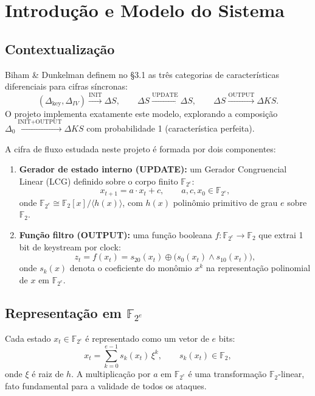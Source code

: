 \documentclass[12pt,a4paper]{article}
\theoremstyle{definition}
\theoremstyle{remark}
\newcommand{\GF}[1]{\mathbb{F}_{2^{#1}}}
\newcommand{\GFtwo}{\mathbb{F}_2}
\newcommand{\xor}{\oplus}
\newcommand{\AND}{\wedge}
\newcommand{\filter}{f}
\newcommand{\ks}{z}
\begin{document}
\section{Introdução e Modelo do Sistema}

\subsection{Contextualização}

\begin{paperref}
  Biham \& Dunkelman definem no \S3.1 as três categorias de características
  diferenciais para cifras síncronas:
  \[
    (\Delta_{\text{key}},\Delta_{IV}) \xrightarrow{\text{INIT}} \Delta S,
    \qquad
    \Delta S \xrightarrow{\text{UPDATE}} \Delta S,
    \qquad
    \Delta S \xrightarrow{\text{OUTPUT}} \Delta KS.
  \]
  O projeto implementa exatamente este modelo, explorando a composição
  $\Delta_0 \xrightarrow{\text{INIT}+\text{OUTPUT}} \Delta KS$ com
  probabilidade 1 (característica perfeita).
\end{paperref}

A cifra de fluxo estudada neste projeto é formada por dois componentes:

\begin{enumerate}[label=(\roman*)]
  \item \textbf{Gerador de estado interno (UPDATE):} um Gerador Congruencial
        Linear (LCG) definido sobre o corpo finito $\GF{e}$:
        \[
          x_{t+1} = a \cdot x_t + c, \qquad a,c,x_0 \in \GF{e},
        \]
        onde $\GF{e} \cong \GFtwo[x] / \langle h(x) \rangle$, com $h(x)$
        polinômio primitivo de grau $e$ sobre $\GFtwo$.

  \item \textbf{Função filtro (OUTPUT):} uma função booleana
        $\filter : \GF{e} \to \GFtwo$ que extrai 1 bit de keystream por clock:
        \[
          \ks_t = \filter(x_t) = s_{20}(x_t) \xor \bigl(s_0(x_t) \AND s_{10}(x_t)\bigr),
        \]
        onde $s_k(x)$ denota o coeficiente do monômio $x^k$ na representação
        polinomial de $x$ em $\GF{e}$.
\end{enumerate}

\subsection{Representação em $\GF{e}$}

Cada estado $x_t \in \GF{e}$ é representado como um vetor de $e$ bits:
\[
  x_t = \sum_{k=0}^{e-1} s_k(x_t)\, \xi^k, \qquad s_k(x_t) \in \GFtwo,
\]
onde $\xi$ é raiz de $h$. A multiplicação por $a$ em $\GF{e}$ é uma
transformação $\GFtwo$-linear, fato fundamental para a validade de todos
os ataques.
\end{document}
